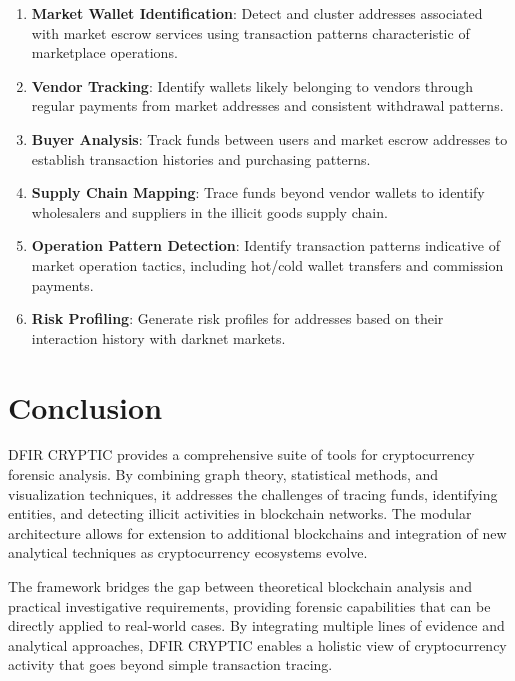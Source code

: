 \documentclass[conference]{IEEEtran}
\begin{document}
\begin{enumerate}
    \item \textbf{Market Wallet Identification}: Detect and cluster addresses associated with market escrow services using transaction patterns characteristic of marketplace operations.
    
    \item \textbf{Vendor Tracking}: Identify wallets likely belonging to vendors through regular payments from market addresses and consistent withdrawal patterns.
    
    \item \textbf{Buyer Analysis}: Track funds between users and market escrow addresses to establish transaction histories and purchasing patterns.
    
    \item \textbf{Supply Chain Mapping}: Trace funds beyond vendor wallets to identify wholesalers and suppliers in the illicit goods supply chain.
    
    \item \textbf{Operation Pattern Detection}: Identify transaction patterns indicative of market operation tactics, including hot/cold wallet transfers and commission payments.
    
    \item \textbf{Risk Profiling}: Generate risk profiles for addresses based on their interaction history with darknet markets.
\end{enumerate}

\section{Conclusion}

DFIR CRYPTIC provides a comprehensive suite of tools for cryptocurrency forensic analysis. By combining graph theory, statistical methods, and visualization techniques, it addresses the challenges of tracing funds, identifying entities, and detecting illicit activities in blockchain networks. The modular architecture allows for extension to additional blockchains and integration of new analytical techniques as cryptocurrency ecosystems evolve.

The framework bridges the gap between theoretical blockchain analysis and practical investigative requirements, providing forensic capabilities that can be directly applied to real-world cases. By integrating multiple lines of evidence and analytical approaches, DFIR CRYPTIC enables a holistic view of cryptocurrency activity that goes beyond simple transaction tracing.
\end{document}
